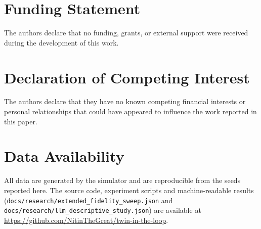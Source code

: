 \documentclass[conference]{IEEEtran}
\begin{document}
\section*{Funding Statement}
The authors declare that no funding, grants, or external support were received during the development of this work.

\section*{Declaration of Competing Interest}
The authors declare that they have no known competing financial interests or personal relationships that could have appeared to influence the work reported in this paper.

\section*{Data Availability}
All data are generated by the simulator and are reproducible from the seeds reported here. The source code, experiment scripts and machine-readable results (\texttt{docs/research/extended\_fidelity\_sweep.json} and \texttt{docs/research/llm\_descriptive\_study.json}) are available at \url{https://github.com/NitinTheGreat/twin-in-the-loop}.

\end{document}
